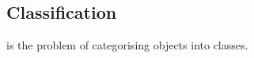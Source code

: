 

    \subsection{Classification}
    \label{sec:classification}

         is the problem of categorising objects into classes. 